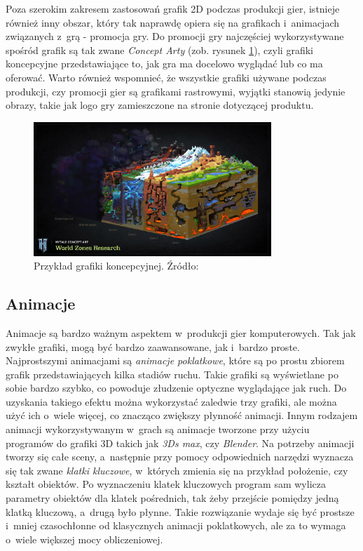 \documentclass[12pt,a4paper,oneside]{book}
\theoremstyle{definition}
\numberwithin{equation}{chapter}
\begin{document}
\par Poza szerokim zakresem zastosowań grafik 2D podczas produkcji gier, istnieje również inny obszar, który tak naprawdę opiera się na grafikach i~animacjach związanych z~grą - promocja gry. Do promocji gry najczęściej wykorzystywane spośród grafik są tak zwane \textit{Concept Arty} (zob. rysunek \ref{ConceptArt}), czyli grafiki koncepcyjne przedstawiające to, jak gra ma docelowo wyglądać lub co ma oferować. Warto również wspomnieć, że wszystkie grafiki używane podczas produkcji, czy promocji gier są grafikami rastrowymi, wyjątki stanowią jedynie obrazy, takie jak logo gry zamieszczone na stronie dotyczącej produktu.

\begin{figure}[hpt!]
        \centering
        \includegraphics[width=0.8\textwidth]{images/conceptArt.jpg}
        \caption{Przykład grafiki koncepcyjnej. Źródło: \cite{conceptArt}}
        \label{ConceptArt}
\end{figure}

\subsection{Animacje}

\par Animacje są bardzo ważnym aspektem w~produkcji gier komputerowych. Tak jak zwykłe grafiki, mogą być bardzo zaawansowane, jak i~bardzo proste. Najprostszymi animacjami są \textit{animacje poklatkowe}, które są po prostu zbiorem grafik przedstawiających kilka stadiów ruchu. Takie grafiki są wyświetlane po sobie bardzo szybko, co powoduje złudzenie optyczne wyglądające jak ruch. Do uzyskania takiego efektu można wykorzystać zaledwie trzy grafiki, ale można użyć ich o~wiele więcej, co znacząco zwiększy płynność animacji. Innym rodzajem animacji wykorzystywanym w~grach są animacje tworzone przy użyciu programów do grafiki 3D takich jak \textit{3Ds max}, czy \textit{Blender}. Na potrzeby animacji tworzy się całe sceny, a~następnie przy pomocy odpowiednich narzędzi wyznacza się tak zwane \textit{klatki kluczowe}, w~których zmienia się na przykład położenie, czy kształt obiektów. Po wyznaczeniu klatek kluczowych program sam wylicza parametry obiektów dla klatek pośrednich, tak żeby przejście pomiędzy jedną klatką kluczową, a~drugą było płynne. Takie rozwiązanie wydaje się być prostsze i~mniej czasochłonne od klasycznych animacji poklatkowych, ale za to wymaga o~wiele większej mocy obliczeniowej.
\end{document}
